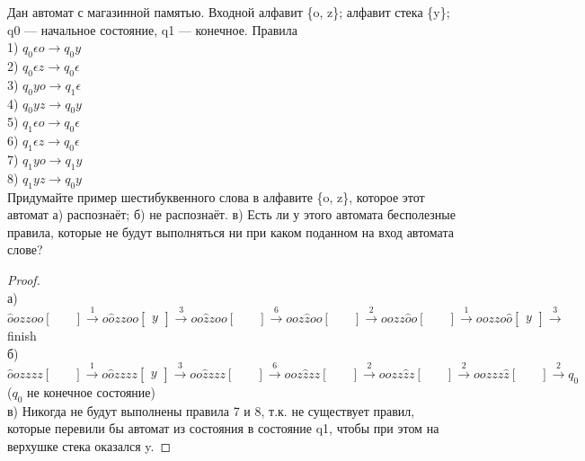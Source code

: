 \begin{problem}
Дан автомат с магазинной памятью. Входной алфавит
\{o, z\}; алфавит стека \{y\}; q0 — начальное состояние, q1 — конечное.
Правила\\
1) $q_0\epsilon o \to q_0y$\\
2) $q_0\epsilon z \to q_0\epsilon$\\
3) $q_0 yo \to q_1 \epsilon$\\
4) $q_0yz \to q_0 y$\\
5) $q_1\epsilon o \to q_0\epsilon$\\
6) $q_1\epsilon z \to q_0\epsilon$\\
7) $q_1 yo \to q_1y$\\
8) $q_1 yz \to q_0 y$\\
Придумайте пример шестибуквенного слова в алфавите
\{o, z\}, которое этот автомат а) распознаёт; б) не распознаёт.
в) Есть ли у этого автомата бесполезные правила, которые
не будут выполняться ни при каком поданном на вход автомата слове?
\end{problem}
\begin{proof} $ $\\
а) 
$
\hat{o}ozzoo
\begin{bmatrix}
    \quad
\end{bmatrix}
\xrightarrow{1}
o\hat{o}zzoo
\begin{bmatrix}
    y
\end{bmatrix}
\xrightarrow{3}
oo\hat{z}zoo
\begin{bmatrix}
    \quad
\end{bmatrix}
\xrightarrow{6}
ooz\hat{z}oo
\begin{bmatrix}
    \quad
\end{bmatrix}
\xrightarrow{2}
oozz\hat{o}o
\begin{bmatrix}
    \quad
\end{bmatrix}
\xrightarrow{1}
oozzo\hat{o}
\begin{bmatrix}
    y
\end{bmatrix}
\xrightarrow{3}
$
finish\\
б) 
$
\hat{o}ozzzz
\begin{bmatrix}
    \quad
\end{bmatrix}
\xrightarrow{1}
o\hat{o}zzzz
\begin{bmatrix}
    y
\end{bmatrix}
\xrightarrow{3}
oo\hat{z}zzz
\begin{bmatrix}
    \quad
\end{bmatrix}
\xrightarrow{6}
ooz\hat{z}zz
\begin{bmatrix}
    \quad
\end{bmatrix}
\xrightarrow{2}
oozz\hat{z}z
\begin{bmatrix}
    \quad
\end{bmatrix}
\xrightarrow{2}
oozzz\hat{z}
\begin{bmatrix}
    \quad
\end{bmatrix}
\xrightarrow{2}
q_0$ ($q_0$ не конечное состояние)\\
в) Никогда не будут выполнены правила 7 и 8, т.к. не существует правил, которые перевили бы автомат из состояния в состояние q1, чтобы при этом на верхушке стека оказался y.
\end{proof}